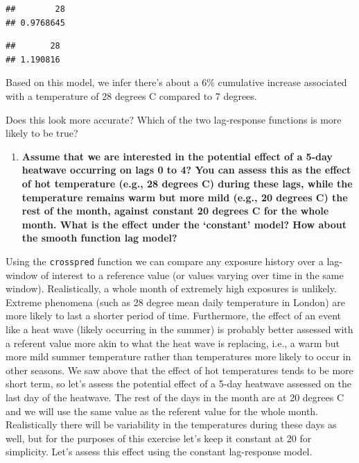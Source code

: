 \documentclass[
]{book}
\newenvironment{Shaded}{\begin{snugshade}}{\end{snugshade}}
\newcommand{\DecValTok}[1]{\textcolor[rgb]{0.00,0.00,0.81}{#1}}
\newcommand{\NormalTok}[1]{#1}
\newcommand{\SpecialCharTok}[1]{\textcolor[rgb]{0.81,0.36,0.00}{\textbf{#1}}}
\providecommand{\tightlist}{%
  \setlength{\itemsep}{0pt}\setlength{\parskip}{0pt}}
\begin{document}
\begin{verbatim}
##        28 
## 0.9768645
\end{verbatim}

\begin{Shaded}
\end{Shaded}

\begin{verbatim}
##       28 
## 1.190816
\end{verbatim}

Based on this model, we infer there's about a 6\% cumulative increase associated with a
temperature of 28 degrees C compared to 7 degrees.

Does this look more accurate? Which of the two lag-response functions is more likely to be true?

\begin{enumerate}
\def\labelenumi{\arabic{enumi}.}
\setcounter{enumi}{3}
\tightlist
\item
  \textbf{Assume that we are interested in the potential effect of a 5-day
  heatwave occurring on lags 0 to 4? You can assess this as the effect of hot temperature
  (e.g., 28 degrees C) during these lags, while the temperature remains warm but more
  mild (e.g., 20 degrees C) the rest of the month, against constant 20 degrees C for
  the whole month. What is the effect under the `constant' model? How about the smooth
  function lag model?}
\end{enumerate}

Using the \texttt{crosspred} function we can compare any exposure history over a lag-window of interest to a reference value (or values varying over time in the same window). Realistically, a whole month of extremely high exposures is unlikely. Extreme phenomena (such as 28 degree mean daily temperature in London) are more likely to last a shorter period of time. Furthermore, the effect of an event like a heat wave (likely occurring in the summer) is probably better assessed with a referent value more akin to what the heat wave is replacing, i.e., a warm but more mild summer temperature rather than temperatures more likely to occur in other seasons. We saw above that the effect of hot temperatures tends to be more short term, so let's assess the potential effect of a 5-day heatwave assessed on the last day of the heatwave. The rest of the days in the month are at 20 degrees C and we will use the same value as the referent value for the whole month. Realistically there will be variability in the temperatures during these days as well, but for the purposes of this exercise let's keep it constant at 20 for simplicity. Let's assess this effect using the constant lag-response model.
\end{document}
